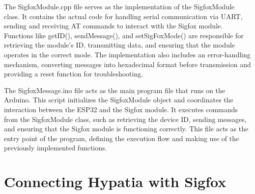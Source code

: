 The SigfoxModule.cpp file serves as the implementation of the SigfoxModule class. It contains the actual code for handling serial communication via UART, sending and receiving AT commands to interact with the Sigfox module. Functions like getID(), sendMessage(), and setSigFoxMode() are responsible for retrieving the module’s ID, transmitting data, and ensuring that the module operates in the correct mode. The implementation also includes an error-handling mechanism, converting messages into hexadecimal format before transmission and providing a reset function for troubleshooting.




The SigfoxMessage.ino file acts as the main program file that runs on the Arduino. This script initializes the SigfoxModule object and coordinates the interaction between the ESP32 and the Sigfox module. It executes commands from the SigfoxModule class, such as retrieving the device ID, sending messages, and ensuring that the Sigfox module is functioning correctly. This file acts as the entry point of the program, defining the execution flow and making use of the previously implemented functions.




\section{Connecting Hypatia with Sigfox}

